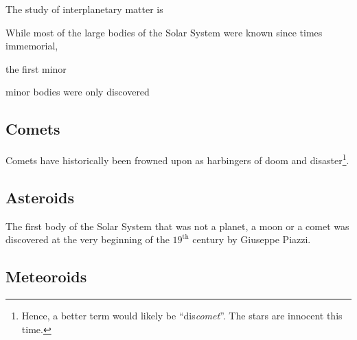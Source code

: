 
The study of interplanetary matter is 

While most of the large bodies of the Solar System were known since times immemorial,



the first minor 

minor bodies were only discovered 

\subsection{Comets} \label{ac}
    Comets have historically been frowned upon as harbingers of doom and disaster\footnote{Hence, a better term would likely be ``dis\textit{comet}''. The stars are innocent this time.}.

\subsection{Asteroids} \label{aa}
    The first body of the Solar System that was not a planet, a moon or a comet was discovered at the very beginning of the $19^{\mathrm{th}}$ century
    by Giuseppe Piazzi.

\subsection{Meteoroids} \label{am}
